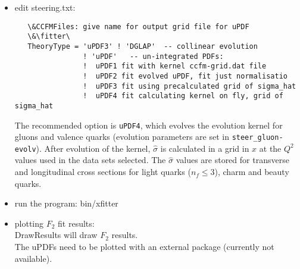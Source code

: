 \begin{itemize}
\item  edit steering.txt: 
   \begin{verbatim}
   \&CCFMFiles: give name for output grid file for uPDF   
   \&\fitter\ 
   TheoryType = 'uPDF3' ! 'DGLAP'  -- collinear evolution
                ! 'uPDF'   -- un-integrated PDFs:
                !  uPDF1 fit with kernel ccfm-grid.dat file
                !  uPDF2 fit evolved uPDF, fit just normalisatio
                !  uPDF3 fit using precalculated grid of sigma_hat
                !  uPDF4 fit calculating kernel on fly, grid of sigma_hat
  \end{verbatim}
  The recommended option is \verb+uPDF4+, which evolves the evolution kernel for gluons and valence quarks
  (evolution parameters are set in \verb+steer_gluon-evolv+). After evolution of the kernel, $\hat {\sigma}$ is
  calculated in a grid in $x$ at the  $Q^2$ values used in the data sets selected. The ${\hat \sigma}$ values are   
  stored for transverse and longitudinal cross sections for light quarks ($n_f \leq 3$), charm and beauty quarks.
\item run the program: bin/xfitter 
   
\item plotting $F_2$ fit results: \\
DrawResults  will draw $F_2$ results. \\
The uPDFs need to be plotted with an external package (currently not available).
\end{itemize}

